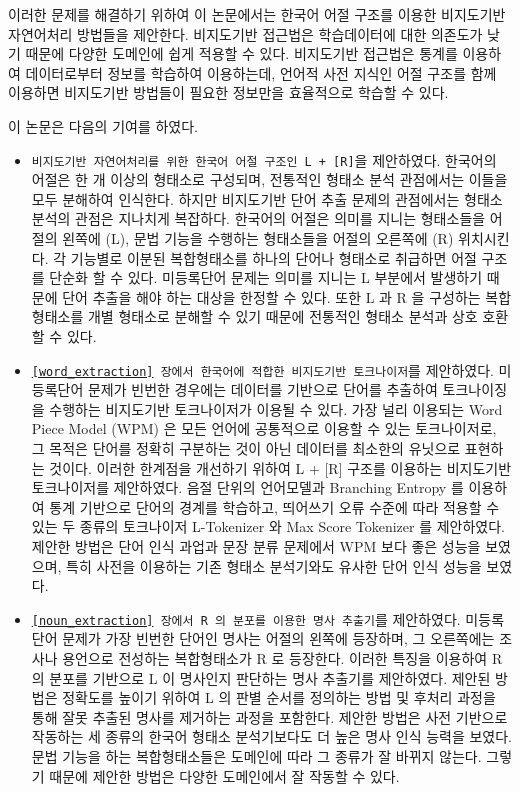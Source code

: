 \documentclass[oneside, ko,phd]{snuthesis_utf8_kor}
\begin{document}
이러한 문제를 해결하기 위하여 이 논문에서는 한국어 어절 구조를 이용한 비지도기반 자연어처리 방법들을 제안한다.
비지도기반 접근법은 학습데이터에 대한 의존도가 낮기 때문에 다양한 도메인에 쉽게 적용할 수 있다.
비지도기반 접근법은 통계를 이용하여 데이터로부터 정보를 학습하여 이용하는데, 언어적 사전 지식인 어절 구조를 함께 이용하면 비지도기반 방법들이 필요한 정보만을 효율적으로 학습할 수 있다.

이 논문은 다음의 기여를 하였다.

\begin{itemize}
  \item \texttt{비지도기반 자연어처리를 위한 한국어 어절 구조인 L + [R]}을 제안하였다. 한국어의 어절은 한 개 이상의 형태소로 구성되며, 전통적인 형태소 분석 관점에서는 이들을 모두 분해하여 인식한다. 하지만 비지도기반 단어 추출 문제의 관점에서는 형태소 분석의 관점은 지나치게 복잡하다. 한국어의 어절은 의미를 지니는 형태소들을 어절의 왼쪽에 (L), 문법 기능을 수행하는 형태소들을 어절의 오른쪽에 (R) 위치시킨다. 각 기능별로 이분된 복합형태소를 하나의 단어나 형태소로 취급하면 어절 구조를 단순화 할 수 있다. 미등록단어 문제는 의미를 지니는 L 부분에서 발생하기 때문에 단어 추출을 해야 하는 대상을 한정할 수 있다. 또한 L 과 R 을 구성하는 복합형태소를 개별 형태소로 분해할 수 있기 때문에 전통적인 형태소 분석과 상호 호환할 수 있다.
  \item \texttt{\ref{word_extraction} 장에서 한국어에 적합한 비지도기반 토크나이저}를 제안하였다. 미등록단어 문제가 빈번한 경우에는 데이터를 기반으로 단어를 추출하여 토크나이징을 수행하는 비지도기반 토크나이저가 이용될 수 있다. 가장 널리 이용되는 Word Piece Model (WPM) 은 모든 언어에 공통적으로 이용할 수 있는 토크나이저로, 그 목적은 단어를 정확히 구분하는 것이 아닌 데이터를 최소한의 유닛으로 표현하는 것이다. 이러한 한계점을 개선하기 위하여 L + [R] 구조를 이용하는 비지도기반 토크나이저를 제안하였다. 음절 단위의 언어모델과 Branching Entropy 를 이용하여 통계 기반으로 단어의 경계를 학습하고, 띄어쓰기 오류 수준에 따라 적용할 수 있는 두 종류의 토크나이저 L-Tokenizer 와 Max Score Tokenizer 를 제안하였다. 제안한 방법은 단어 인식 과업과 문장 분류 문제에서 WPM 보다 좋은 성능을 보였으며, 특히 사전을 이용하는 기존 형태소 분석기와도 유사한 단어 인식 성능을 보였다.
  \item \texttt{\ref{noun_extraction} 장에서 R 의 분포를 이용한 명사 추출기}를 제안하였다. 미등록단어 문제가 가장 빈번한 단어인 명사는 어절의 왼쪽에 등장하며, 그 오른쪽에는 조사나 용언으로 전성하는 복합형태소가 R 로 등장한다. 이러한 특징을 이용하여 R 의 분포를 기반으로 L 이 명사인지 판단하는 명사 추출기를 제안하였다. 제안된 방법은 정확도를 높이기 위하여 L 의 판별 순서를 정의하는 방법 및 후처리 과정을 통해 잘못 추출된 명사를 제거하는 과정을 포함한다. 제안한 방법은 사전 기반으로 작동하는 세 종류의 한국어 형태소 분석기보다도 더 높은 명사 인식 능력을 보였다. 문법 기능을 하는 복합형태소들은 도메인에 따라 그 종류가 잘 바뀌지 않는다. 그렇기 때문에 제안한 방법은 다양한 도메인에서 잘 작동할 수 있다.

\end{itemize}
\end{document}
